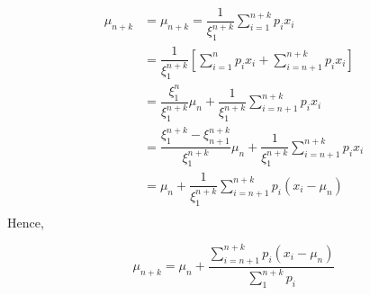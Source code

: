 \documentclass[a4paper, 11pt]{article}
\begin{document}
\begin{align*}
  \mu_{n + k}
  &=
    \mu_{n + k} = \dfrac{1}{\xi_1^{n+k}} \sum_{i = 1}^{n+k} p_i x_i \\
  &=
    \dfrac{1}{\xi_{1}^{n+k}}
    \left[
    \sum_{i = 1}^{n} p_i x_i +
    \sum_{i = n+1}^{n+k} p_i x_i
    \right] \\
  &= \dfrac{\xi_{1}^{n}}{\xi_{1}^{n+k}}
    \mu_n +
    \dfrac{1}{\xi_{1}^{n+k}}
    \sum_{i = n+1}^{n+k} p_i x_i \\
  &= \dfrac{\xi_{1}^{n+k} - \xi_{n+1}^{n+k}}{\xi_{1}^{n+k}}
    \mu_n +
    \dfrac{1}{\xi_{1}^{n+k}}
    \sum_{i = n+1}^{n+k} p_i x_i \\
  &= \mu_n +
    \dfrac{1}{\xi_{1}^{n+k}}
    \sum_{i = n+1}^{n+k} p_i (x_i - \mu_n) \\
\end{align*}
Hence,
\begin{framed}
  \begin{displaymath}
    \mu_{n+k}= \mu_n +
    \dfrac{\sum_{i = n+1}^{n+k} p_i (x_i - \mu_n)}{\sum_{1}^{n+k}p_i}
  \end{displaymath}
\end{framed}




\end{document}
